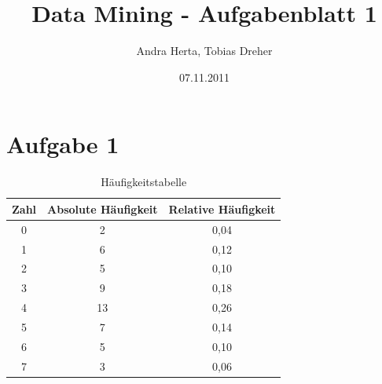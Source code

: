 \title{Data Mining - Aufgabenblatt 1}
\author{Andra Herta, Tobias Dreher}
\date{07.11.2011}

 


\maketitle

\section*{Aufgabe 1}

\begin{table}[htb]
  \centering
  \begin{tabular}{c|c|c}
    \textbf{Zahl} & \textbf{Absolute Häufigkeit} & \textbf{Relative Häufigkeit}\\
    \hline
    0 & 2 & 0,04\\
    1 & 6 & 0,12\\
    2 & 5 & 0,10\\
    3 & 9 & 0,18\\
    4 & 13 & 0,26\\
    5 & 7 & 0,14\\
    6 & 5 & 0,10\\
    7 & 3 & 0,06\\
  \end{tabular}
  \caption{Häufigkeitstabelle}
\end{table}

